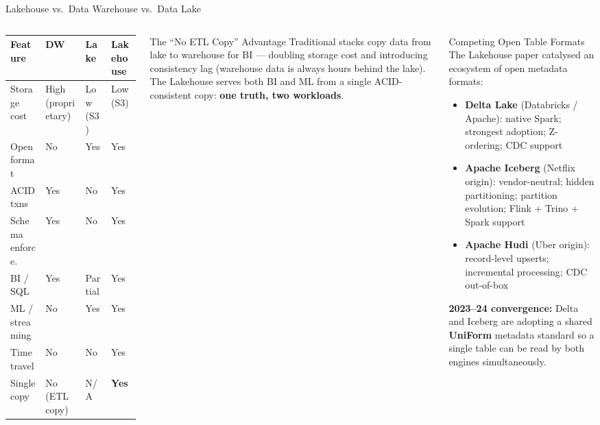 \documentclass[aspectratio=169,10pt]{beamer}
\begin{document}
\begin{frame}{Lakehouse vs.\ Data Warehouse vs.\ Data Lake}
  \begin{columns}[T]
      \renewcommand{\arraystretch}{1.3}
      \begin{tabular}{@{}p{2.5cm}p{2.0cm}p{2.0cm}p{2.0cm}@{}}
        \toprule
        \textbf{Feature} & \textbf{DW} & \textbf{Lake} & \textbf{Lakehouse} \\
        \midrule
        Storage cost    & High (proprietary) & Low (S3)    & Low (S3) \\
        Open format     & No          & Yes           & Yes \\
        ACID txns       & Yes         & No            & Yes \\
        Schema enforce. & Yes         & No            & Yes \\
        BI / SQL        & Yes         & Partial       & Yes \\
        ML / streaming  & No          & Yes           & Yes \\
        Time travel     & No          & No            & Yes \\
        Single copy     & No (ETL copy) & N/A         & \textbf{Yes} \\
        \bottomrule
      \end{tabular}
      \vspace{8pt}
      \begin{alertblock}{The ``No ETL Copy'' Advantage}
        Traditional stacks copy data from lake to warehouse for BI —
        doubling storage cost and introducing consistency lag
        (warehouse data is always hours behind the lake).
        The Lakehouse serves both BI and ML from a single
        ACID-consistent copy: \textbf{one truth, two workloads}.
      \end{alertblock}

      \begin{block}{Competing Open Table Formats}
        The Lakehouse paper catalysed an ecosystem of
        open metadata formats:
        \begin{itemize}
          \item \textbf{Delta Lake} (Databricks / Apache): native
                Spark; strongest adoption; Z-ordering; CDC support
          \item \textbf{Apache Iceberg} (Netflix origin):
                vendor-neutral; hidden partitioning; partition
                evolution; Flink + Trino + Spark support
          \item \textbf{Apache Hudi} (Uber origin): record-level
                upserts; incremental processing; CDC out-of-box
        \end{itemize}
        \textbf{2023--24 convergence:} Delta and Iceberg are
        adopting a shared \textbf{UniForm} metadata standard
        so a single table can be read by both engines simultaneously.
      \end{block}
  \end{columns}
\end{frame}
\end{document}
